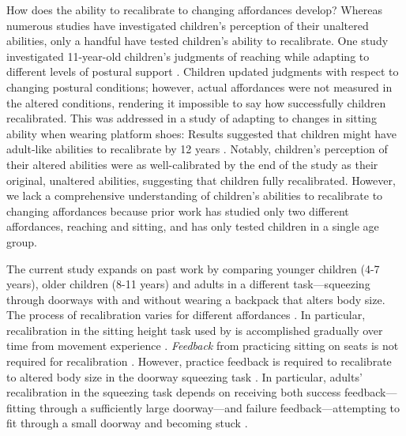 \documentclass[a4paper,man,natbib,floatsintext,noextraspace]{apa6}
\begin{document}
How does the ability to recalibrate to changing affordances develop? Whereas numerous studies have investigated children's perception of their unaltered abilities, only a handful have tested children's ability to recalibrate. One study investigated 11-year-old children’s judgments of reaching while adapting to different levels of postural support \citep{JohnsonWade2009}. Children updated judgments with respect to changing postural conditions; however, actual affordances were not measured in the altered conditions, rendering it impossible to say how successfully children recalibrated. This was addressed in a study of adapting to changes in sitting ability when wearing platform shoes: Results suggested that children might have adult-like abilities to recalibrate by 12 years \citep{ChenRecal}. Notably, children's perception of their altered abilities were as well-calibrated by the end of the study as their original, unaltered abilities, suggesting that children fully recalibrated. However, we lack a comprehensive understanding of children's abilities to recalibrate to changing affordances because prior work has studied only two different affordances, reaching and sitting, and has only tested children in a single age group. 

The current study expands on past work by comparing younger children (4-7 years), older children (8-11 years) and adults in a different task---squeezing through doorways with and without wearing a backpack that alters body size. The process of recalibration varies for different affordances \citep{Recal}. In particular, recalibration in the sitting height task used by \cite{ChenRecal} is accomplished gradually over time from movement experience \cite{Mark87}. \textit{Feedback} from practicing sitting on seats is not required for recalibration \citep{MarkSitting90}. However, practice feedback is required to recalibrate to altered body size in the doorway squeezing task \citep{Recal,PregAps}. In particular, adults' recalibration in the squeezing task depends on receiving both success feedback---fitting through a sufficiently large doorway---and failure feedback---attempting to fit through a small doorway and becoming stuck \citep{DoorwayLearning}. 
\end{document}

